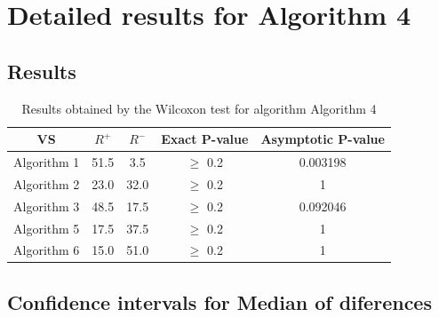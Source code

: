 \documentclass[a4paper,10pt]{article}
\begin{document}
 \clearpage 


\section{Detailed results for Algorithm 4}


\subsection{Results}

\begin{table}[!htp]
\centering\small
\begin{tabular}{
|c|c|c|c|c|}
\hline
 VS & $R^{+}$ & $R^{-}$ & Exact P-value & Asymptotic P-value \\ \hline 
Algorithm 1 & 51.5 & 3.5 & $\geq$ 0.2 & 0.003198\\ \hline 
Algorithm 2 & 23.0 & 32.0 & $\geq$ 0.2 & 1\\ \hline 
Algorithm 3 & 48.5 & 17.5 & $\geq$ 0.2 & 0.092046\\ \hline 
Algorithm 5 & 17.5 & 37.5 & $\geq$ 0.2 & 1\\ \hline 
Algorithm 6 & 15.0 & 51.0 & $\geq$ 0.2 & 1\\ \hline 

\end{tabular}
\caption{Results obtained by the Wilcoxon test for algorithm Algorithm 4}
\end{table}

\subsection{Confidence intervals for Median of diferences}
\end{document}
